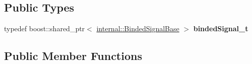 \subsection*{Public Types}
\begin{DoxyCompactItemize}
\item 
typedef boost\+::shared\+\_\+ptr$<$ \hyperlink{structdynamic__graph_1_1internal_1_1BindedSignalBase}{internal\+::\+Binded\+Signal\+Base} $>$ {\bfseries binded\+Signal\+\_\+t}\hypertarget{classdynamic__graph_1_1RosQueuedSubscribe_a2f75c04157d429fa28dbce0e307762af}{}\label{classdynamic__graph_1_1RosQueuedSubscribe_a2f75c04157d429fa28dbce0e307762af}

\end{DoxyCompactItemize}
\subsection*{Public Member Functions}
